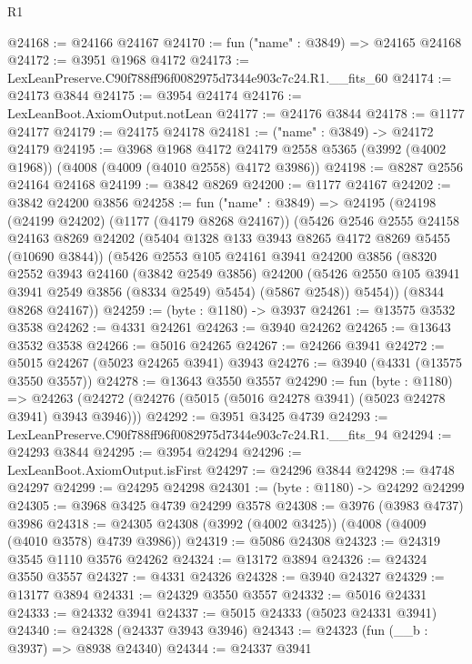 \begin{lexlean}{R1}
\begin{coremodule}
@24168 := @24166 @24167
@24170 := fun ("name" : @3849) => @24165 @24168
@24172 := @3951 @1968 @4172
@24173 := LexLeanPreserve.C90f788ff96f0082975d7344e903c7c24.R1.__fits_60
@24174 := @24173 @3844
@24175 := @3954 @24174
@24176 := LexLeanBoot.AxiomOutput.notLean
@24177 := @24176 @3844
@24178 := @1177 @24177
@24179 := @24175 @24178
@24181 := ("name" : @3849) -> @24172 @24179
@24195 := @3968
    @1968
    @4172
    @24179
    @2558
    @5365
    (@3992 (@4002 @1968))
    (@4008 (@4009 (@4010 @2558) @4172 @3986))
@24198 := @8287 @2556 @24164 @24168
@24199 := @3842 @8269
@24200 := @1177 @24167
@24202 := @3842 @24200 @3856
@24258 := fun ("name" : @3849) =>
  @24195
    (@24198
      (@24199 @24202)
      (@1177 (@4179 @8268 @24167))
      (@5426
        @2546
        @2555
        @24158
        @24163
        @8269
        @24202
        (@5404 @1328 @133 @3943 @8265 @4172 @8269 @5455 (@10690 @3844))
        (@5426
          @2553
          @105
          @24161
          @3941
          @24200
          @3856
          (@8320
            @2552
            @3943
            @24160
            (@3842 @2549 @3856)
            @24200
            (@5426 @2550 @105 @3941 @3941 @2549 @3856 (@8334 @2549) @5454)
            (@5867 @2548))
          @5454))
      (@8344 @8268 @24167))
@24259 := (byte : @1180) -> @3937
@24261 := @13575 @3532 @3538
@24262 := @4331 @24261
@24263 := @3940 @24262
@24265 := @13643 @3532 @3538
@24266 := @5016 @24265
@24267 := @24266 @3941
@24272 := @5015 @24267 (@5023 @24265 @3941) @3943
@24276 := @3940 (@4331 (@13575 @3550 @3557))
@24278 := @13643 @3550 @3557
@24290 := fun (byte : @1180) =>
  @24263 (@24272 (@24276 (@5015 (@5016 @24278 @3941) (@5023 @24278 @3941) @3943 @3946)))
@24292 := @3951 @3425 @4739
@24293 := LexLeanPreserve.C90f788ff96f0082975d7344e903c7c24.R1.__fits_94
@24294 := @24293 @3844
@24295 := @3954 @24294
@24296 := LexLeanBoot.AxiomOutput.isFirst
@24297 := @24296 @3844
@24298 := @4748 @24297
@24299 := @24295 @24298
@24301 := (byte : @1180) -> @24292 @24299
@24305 := @3968 @3425 @4739 @24299 @3578
@24308 := @3976 (@3983 @4737) @3986
@24318 := @24305 @24308 (@3992 (@4002 @3425)) (@4008 (@4009 (@4010 @3578) @4739 @3986))
@24319 := @5086 @24308
@24323 := @24319 @3545 @1110 @3576 @24262
@24324 := @13172 @3894
@24326 := @24324 @3550 @3557
@24327 := @4331 @24326
@24328 := @3940 @24327
@24329 := @13177 @3894
@24331 := @24329 @3550 @3557
@24332 := @5016 @24331
@24333 := @24332 @3941
@24337 := @5015 @24333 (@5023 @24331 @3941)
@24340 := @24328 (@24337 @3943 @3946)
@24343 := @24323 (fun (__b : @3937) => @8938 @24340)
@24344 := @24337 @3941

\end{coremodule}
\end{lexlean}
